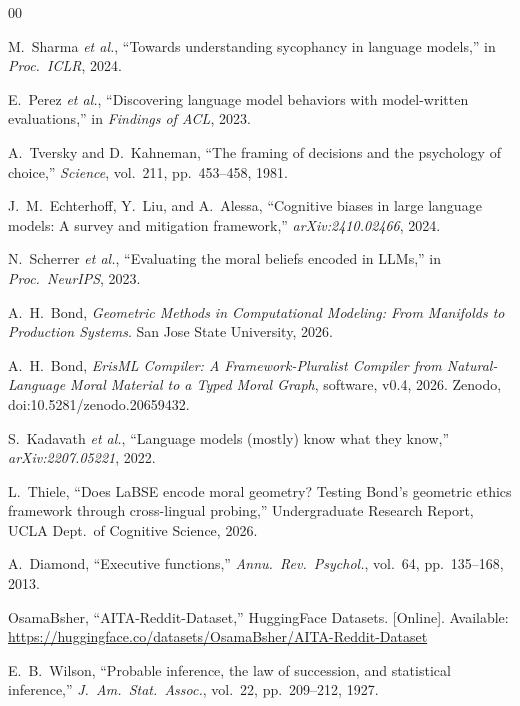 \documentclass[conference]{IEEEtran}
\begin{document}
\begin{thebibliography}{00}

M.~Sharma \emph{et al.}, ``Towards understanding sycophancy in language models,'' in \emph{Proc.\ ICLR}, 2024.

E.~Perez \emph{et al.}, ``Discovering language model behaviors with model-written evaluations,'' in \emph{Findings of ACL}, 2023.

A.~Tversky and D.~Kahneman, ``The framing of decisions and the psychology of choice,'' \emph{Science}, vol.~211, pp.~453--458, 1981.

J.~M.~Echterhoff, Y.~Liu, and A.~Alessa, ``Cognitive biases in large language models: A survey and mitigation framework,'' \emph{arXiv:2410.02466}, 2024.

N.~Scherrer \emph{et al.}, ``Evaluating the moral beliefs encoded in LLMs,'' in \emph{Proc.\ NeurIPS}, 2023.

A.~H.~Bond, \emph{Geometric Methods in Computational Modeling: From Manifolds to Production Systems}. San Jose State University, 2026.

A.~H.~Bond, \emph{ErisML Compiler: A Framework-Pluralist Compiler from Natural-Language Moral Material to a Typed Moral Graph}, software, v0.4, 2026. Zenodo, doi:10.5281/zenodo.20659432.

S.~Kadavath \emph{et al.}, ``Language models (mostly) know what they know,'' \emph{arXiv:2207.05221}, 2022.

L.~Thiele, ``Does LaBSE encode moral geometry? Testing Bond's geometric ethics framework through cross-lingual probing,'' Undergraduate Research Report, UCLA Dept.\ of Cognitive Science, 2026.

A.~Diamond, ``Executive functions,'' \emph{Annu.\ Rev.\ Psychol.}, vol.~64, pp.~135--168, 2013.

OsamaBsher, ``AITA-Reddit-Dataset,'' HuggingFace Datasets. [Online]. Available: \url{https://huggingface.co/datasets/OsamaBsher/AITA-Reddit-Dataset}

E.~B.~Wilson, ``Probable inference, the law of succession, and statistical inference,'' \emph{J.\ Am.\ Stat.\ Assoc.}, vol.~22, pp.~209--212, 1927.


\end{thebibliography}
\end{document}
